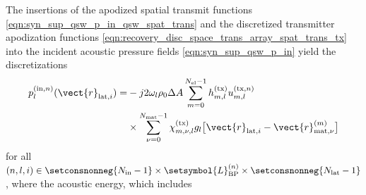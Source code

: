 The insertions of
the apodized spatial transmit functions
\eqref{eqn:syn_sup_qsw_p_in_qsw_spat_trans} and
the discretized transmitter apodization functions
\eqref{eqn:recovery_disc_space_trans_array_spat_trans_tx} into
the incident acoustic pressure fields
\eqref{eqn:syn_sup_qsw_p_in} yield
the discretizations
\begin{equation}
\begin{split}
  p_{l}^{(\text{in}, n)}( \vect{r}_{\text{lat}, i} )
  =
  & - j 2 \omega_{l} \rho_{0} \Delta A
    \sum_{ m = 0 }^{ N_{\text{el}} - 1 }
      h_{m, l}^{(\text{tx})}
      u_{m, l}^{(\text{tx}, n)}\\
  &   \times
      \sum_{ \nu = 0 }^{ N_{\text{mat}} - 1 }
        \chi_{m, \nu, l}^{(\text{tx})}
        g_{l}\bigl[ \vect{r}_{\text{lat}, i} - \vect{r}_{\text{mat}, \nu}^{(m)} \bigr]
\end{split}
\label{eqn:recovery_p_in}
\end{equation}
for
all $( n, l, i ) \in \setconsnonneg{ N_{\text{in}} - 1 } \times \setsymbol{L}_{ \text{BP} }^{(n)} \times \setconsnonneg{ N_{\text{lat}} - 1 }$, where
the acoustic energy, which includes

